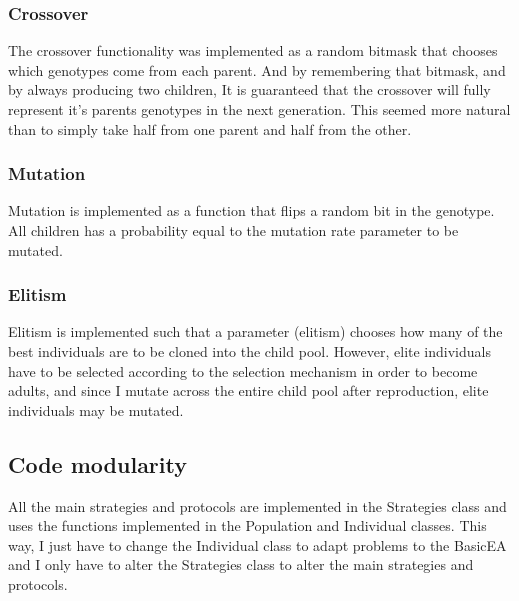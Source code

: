 \documentclass[11pt]{article}
\begin{document}
\subsubsection*{Crossover}

The crossover functionality was implemented as a random bitmask that 
chooses which genotypes come from each parent. And by remembering that
bitmask, and by always producing two children, It is guaranteed that the 
crossover will fully represent it's parents genotypes in the next generation.
This seemed more natural than to simply take half from one parent and
half from the other.

\subsubsection*{Mutation}

Mutation is implemented as a function that flips a random bit in the genotype.
All children has a probability equal to the mutation rate parameter to be
mutated. 

\subsubsection*{Elitism}

Elitism is implemented such that a parameter (elitism) chooses how many
of the best individuals are to be cloned into the child pool. However, elite 
individuals have to be selected according to the selection mechanism in order
to become adults, and since I mutate across the entire child pool after reproduction, 
elite individuals may be mutated.

\subsection*{Code modularity} %

All the main strategies and protocols are implemented in the Strategies class and
uses the functions implemented in the Population and Individual classes.
This way, I just have to change the Individual class to adapt problems to the
BasicEA and I only have to alter the Strategies class to alter the 
main strategies and protocols.
\end{document}

